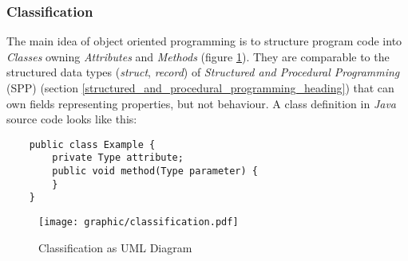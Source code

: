 %
%
%
%
%
%
%

\subsubsection{Classification}
\label{classification_heading}

The main idea of object oriented programming is to structure program code into
\emph{Classes} owning \emph{Attributes} and \emph{Methods} (figure
\ref{classification_figure}). They are comparable to the structured data types
(\emph{struct}, \emph{record}) of \emph{Structured and Procedural Programming}
(SPP) (section \ref{structured_and_procedural_programming_heading}) that can
own fields representing properties, but not behaviour. A class definition in
\emph{Java} source code looks like this:

\begin{scriptsize}
    \begin{verbatim}
    public class Example {
        private Type attribute;
        public void method(Type parameter) {
        }
    }
    \end{verbatim}
\end{scriptsize}

\begin{figure}[ht]
    \begin{center}
        \texttt{[image: graphic/classification.pdf]}
        \caption{Classification as UML Diagram}
        \label{classification_figure}
    \end{center}
\end{figure}

